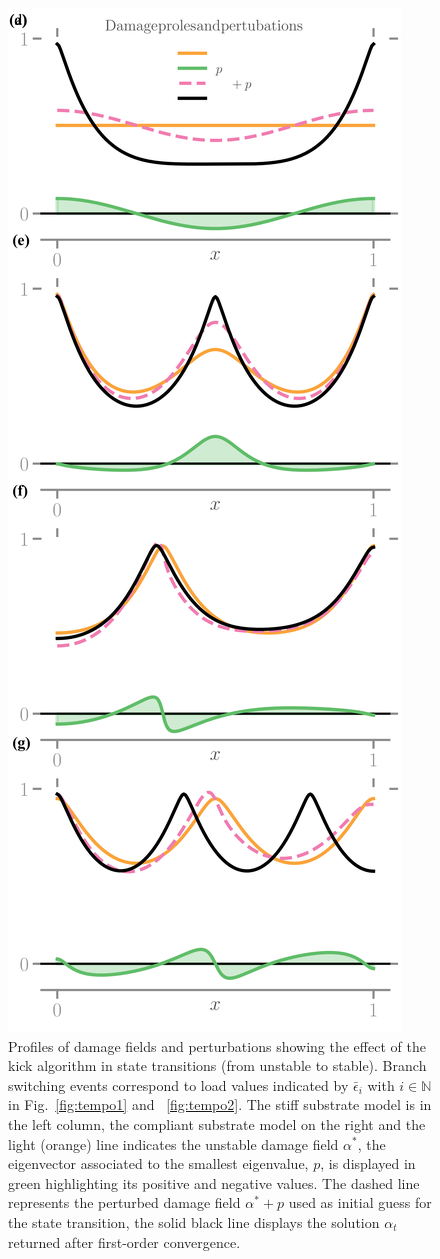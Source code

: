 \begin{figure}[htbp]
    \includegraphics*[align=c,width=.45\textwidth]{../images/model_compliant_kick_profiles.png}
    \caption{
        Profiles of damage fields and perturbations showing the effect of the kick algorithm in state transitions (from unstable to stable). Branch switching events correspond to load values indicated by $\bar \epsilon_i$ with $i\in \mathbb N$ in {Fig.~\ref{fig:tempo1} and ~\ref{fig:tempo2}}. The stiff substrate model is in the left column, the compliant substrate model on the right and  the light (orange) line indicates the unstable damage field $\alpha^*$, the eigenvector associated to the smallest eigenvalue, $p$, is displayed in green highlighting its positive and negative values. The dashed line represents the perturbed damage field  $\alpha^*+p$ used as initial guess for the state transition, the solid black line displays the solution $\alpha_t$ returned after first-order convergence.}
    \label{fig:kick}
\end{figure}


